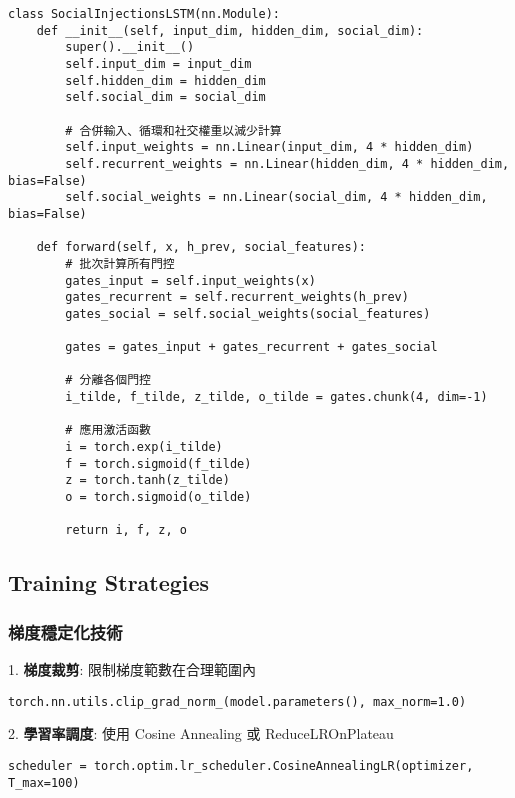 \documentclass[11pt,a4paper]{article}
\begin{document}
\begin{lstlisting}[style=pythonstyle, caption={SocialInjectionsLSTM 實現}]
class SocialInjectionsLSTM(nn.Module):
    def __init__(self, input_dim, hidden_dim, social_dim):
        super().__init__()
        self.input_dim = input_dim
        self.hidden_dim = hidden_dim
        self.social_dim = social_dim
        
        # 合併輸入、循環和社交權重以減少計算
        self.input_weights = nn.Linear(input_dim, 4 * hidden_dim)
        self.recurrent_weights = nn.Linear(hidden_dim, 4 * hidden_dim, bias=False)
        self.social_weights = nn.Linear(social_dim, 4 * hidden_dim, bias=False)
        
    def forward(self, x, h_prev, social_features):
        # 批次計算所有門控
        gates_input = self.input_weights(x)
        gates_recurrent = self.recurrent_weights(h_prev)
        gates_social = self.social_weights(social_features)
        
        gates = gates_input + gates_recurrent + gates_social
        
        # 分離各個門控
        i_tilde, f_tilde, z_tilde, o_tilde = gates.chunk(4, dim=-1)
        
        # 應用激活函數
        i = torch.exp(i_tilde)
        f = torch.sigmoid(f_tilde)
        z = torch.tanh(z_tilde)
        o = torch.sigmoid(o_tilde)
        
        return i, f, z, o
\end{lstlisting}

\subsection{Training Strategies}

\subsubsection{梯度穩定化技術}
1. \textbf{梯度裁剪}: 限制梯度範數在合理範圍內
   \begin{lstlisting}[style=pythonstyle]
   torch.nn.utils.clip_grad_norm_(model.parameters(), max_norm=1.0)
   \end{lstlisting}

2. \textbf{學習率調度}: 使用 Cosine Annealing 或 ReduceLROnPlateau
   \begin{lstlisting}[style=pythonstyle]
   scheduler = torch.optim.lr_scheduler.CosineAnnealingLR(optimizer, T_max=100)
   \end{lstlisting}
\end{document}

